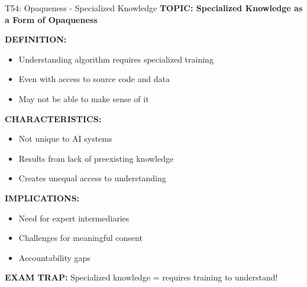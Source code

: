 \documentclass[8pt]{beamer}
\begin{document}
	\begin{frame}{T54: Opaqueness - Specialized Knowledge}
		\fontsize{6.5}{7.5}\selectfont
		\textbf{TOPIC: Specialized Knowledge as a Form of Opaqueness}
		
		\vspace{0.1cm}
		\textbf{DEFINITION:}
		\begin{itemize}
			\item Understanding algorithm requires specialized training
			\item Even with access to source code and data
			\item May not be able to make sense of it
		\end{itemize}
		
		\vspace{0.1cm}
		\textbf{CHARACTERISTICS:}
		\begin{itemize}
			\item Not unique to AI systems
			\item Results from lack of preexisting knowledge
			\item Creates unequal access to understanding
		\end{itemize}
		
		\vspace{0.1cm}
		\textbf{IMPLICATIONS:}
		\begin{itemize}
			\item Need for expert intermediaries
			\item Challenges for meaningful consent
			\item Accountability gaps
		\end{itemize}
		
		\textcolor{myred}{\textbf{EXAM TRAP:}} Specialized knowledge = \textcolor{myblue}{requires training to understand}!
	\end{frame}
	
\end{document}
